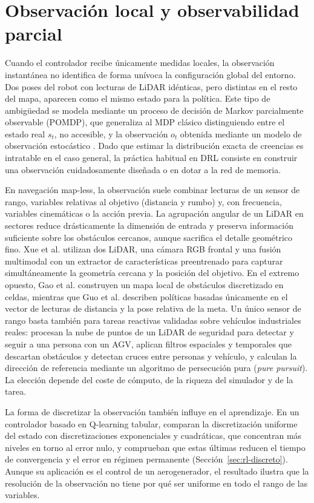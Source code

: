 \section{Observación local y observabilidad parcial}
Cuando el controlador recibe únicamente medidas locales, la observación
instantánea no identifica de forma unívoca la configuración global del
entorno. Dos poses del robot con lecturas de LiDAR idénticas, pero
distintas en el resto del mapa, aparecen como el mismo estado para la
política. Este tipo de ambigüedad se modela mediante un proceso de decisión
de Markov parcialmente observable (POMDP), que generaliza al MDP clásico
distinguiendo entre el estado real $s_t$, no accesible, y la observación
$o_t$ obtenida mediante un modelo de observación estocástico
\citep{md2024novel,gao2025hierarchical}. Dado que estimar la distribución
exacta de creencias es intratable en el caso general, la práctica habitual
en DRL consiste en construir una observación cuidadosamente diseñada o en
dotar a la red de memoria.

En navegación map-less, la observación suele combinar lecturas de un
sensor de rango, variables relativas al objetivo (distancia y rumbo) y, con
frecuencia, variables cinemáticas o la acción previa. La agrupación angular
de un LiDAR en sectores reduce drásticamente la dimensión de entrada y
preserva información suficiente sobre los obstáculos cercanos, aunque
sacrifica el detalle geométrico fino. Xue et al. \citep{xue2022using}
utilizan dos LiDAR, una cámara RGB frontal y una fusión multimodal con un
extractor de características preentrenado para capturar simultáneamente la
geometría cercana y la posición del objetivo. En el extremo opuesto, Gao
et al. \citep{gao2025hierarchical} construyen un mapa local de obstáculos
discretizado en celdas, mientras que Guo et al. \citep{guo2025map}
describen políticas basadas únicamente en el vector de lecturas de
distancia y la pose relativa de la meta. Un único sensor de rango basta
también para tareas reactivas validadas sobre vehículos industriales
reales: \citet{sierragarcia2023development} procesan la nube de puntos
de un LiDAR de seguridad para detectar y seguir a una persona con un AGV,
aplican filtros espaciales y temporales que descartan obstáculos y
detectan cruces entre personas y vehículo, y calculan la dirección de
referencia mediante un algoritmo de persecución pura (\textit{pure
pursuit}). La elección depende del coste de cómputo, de la riqueza del
simulador y de la tarea.

La forma de discretizar la observación también influye en el
aprendizaje. En un controlador basado en Q-learning tabular,
\citet{gilmacia2025exponential} comparan la discretización uniforme del
estado con discretizaciones exponenciales y cuadráticas, que concentran
más niveles en torno al error nulo, y comprueban que estas últimas
reducen el tiempo de convergencia y el error en régimen permanente
(Sección~\ref{sec:rl-discreto}). Aunque su aplicación es el control de
un aerogenerador, el resultado ilustra que la resolución de la
observación no tiene por qué ser uniforme en todo el rango de las
variables.

